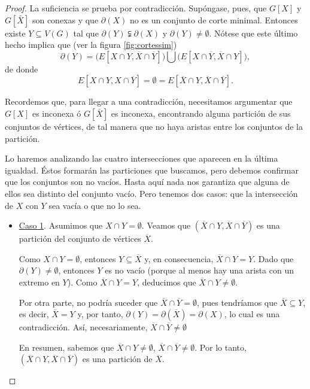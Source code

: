\begin{proof}
La suficiencia se prueba por contradicción. Supóngase, pues, que $G[X]$ y $G[\bar{X}]$ son conexas y que $\partial(X)$ no es un conjunto de corte minimal. Entonces existe $Y \subseteq V(G)$ tal que $\partial(Y) \subsetneqq \partial(X)$ y $\partial(Y) \neq \emptyset$. Nótese que este último hecho implica que (ver la figura \ref{fig:cortessim}) $$\partial(Y)= \big(E[X \cap Y, \overline{X} \cap \overline{Y}]) \bigcup (E[X \cap \overline{Y}, \overline{X} \cap Y]\big),$$ de donde $$E[X \cap Y, X \cap \overline{Y}] = \emptyset = E[\overline{X} \cap Y, \overline{X} \cap \overline{Y}].$$ 

Recordemos que, para llegar a una contradicción, necesitamos argumentar que $G[X]$ es inconexa ó $G[\bar{X}]$ es inconexa, encontrando alguna partición de sus conjuntos de vértices, de tal manera que no haya aristas entre los conjuntos de la partición. 

Lo haremos analizando las cuatro intersecciones que aparecen en la última igualdad. Éstos formarán las particiones que buscamos, pero debemos confirmar que los conjuntos son no vacíos. Hasta aquí nada nos garantiza que alguna de ellos sea distinto del conjunto vacío. Pero tenemos dos casos: que la intersección de $X$ con $Y$ sea vacía o que no lo sea.   


\begin{itemize}
    \item \underline{Caso 1}. Asumimos que $X \cap Y = \emptyset$. Veamos que $(\overline{X} \cap Y, \overline{X} \cap \overline{Y})$ es una partición del conjunto de vértices $\overline{X}$.
    
    Como $X \cap Y = \emptyset$, entonces $Y \subseteq \overline{X}$ y, en consecuencia, $\overline{X} \cap Y = Y$. Dado que $\partial(Y) \neq \emptyset$, entonces $Y$ es no vacío (porque al menos hay una arista con un extremo en $Y$). Como $\overline{X} \cap Y = Y$, deducimos que $\overline{X} \cap Y \neq \emptyset$.
    
    Por otra parte, no podría suceder que $\overline{X} \cap \overline{Y} = \emptyset$, pues tendríamos que $\overline{X} \subseteq Y$, es decir, $\overline{X} = Y$ y, por tanto, $\partial(Y) = \partial(\overline{X})=\partial(X)$, lo cual es una contradicción. Así, necesariamente, $\overline{X} \cap \overline{Y} \neq \emptyset$

    En resumen, sabemos que $\overline{X} \cap Y \neq \emptyset$, $\overline{X} \cap \overline{Y} \neq \emptyset$. Por lo tanto, $(\overline{X} \cap Y, \overline{X} \cap \overline{Y})$ es una partición de $\overline{X}$.
    

\end{itemize}
\end{proof}
